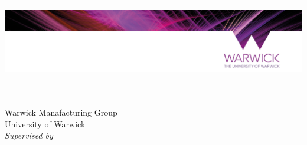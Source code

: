 \makeatletter
\begin{titlepage}

    \vspace*{-1.35in}

    \begin{adjustwidth}{-\oddsidemargin-1in}{-\rightmargin}
        \centering
        \includegraphics[width=\paperwidth]{aux/head.jpeg}
    \end{adjustwidth}

    \vspace*{1.5in}

    \textbf{\Huge \@title} \\ [2cm]

    \Large \textbf{\@author} \\ [1cm]
    Warwick Manafacturing Group \\
    University of Warwick \\

    \emph{Supervised by \@supervisor} \\

    \vfill

\end{titlepage}
\makeatother